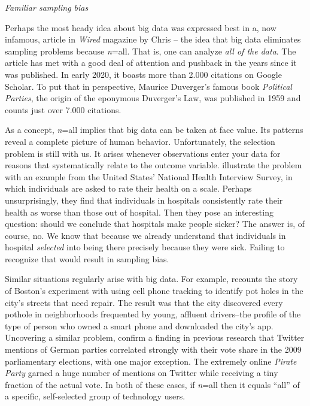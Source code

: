 \documentclass[12pt,]{article}
\begin{document}
\emph{Familiar sampling bias}

Perhaps the most heady idea about big data was expressed best in a, now
infamous, article in \emph{Wired} magazine by Chris \citet{anderson08}
-- the idea that big data eliminates sampling problems because
\emph{n}=all. That is, one can analyze \emph{all of the data}. The
article has met with a good deal of attention and pushback in the years
since it was published. In early 2020, it boasts more than 2.000
citations on Google Scholar. To put that in perspective, Maurice
Duverger's famous book \emph{Political Parties}, the origin of the
eponymous Duverger's Law, was published in 1959 and counts just over
7.000 citations.

As a concept, \emph{n}=all implies that big data can be taken at face
value. Its patterns reveal a complete picture of human behavior.
Unfortunately, the selection problem is still with us. It arises
whenever observations enter your data for reasons that systematically
relate to the outcome variable. \citet{AP08} illustrate the problem with
an example from the United States' National Health Interview Survey, in
which individuals are asked to rate their health on a scale. Perhaps
unsurprisingly, they find that individuals in hospitals consistently
rate their health as worse than those out of hospital. Then they pose an
interesting question: should we conclude that hospitals make people
sicker? The answer is, of course, no. We know that because we already
understand that individuals in hospital \emph{selected} into being there
precisely because they were sick. Failing to recognize that would result
in sampling bias.

Similar situations regularly arise with big data. For example,
\citet{harford14} recounts the story of Boston's experiment with using
cell phone tracking to identify pot holes in the city's streets that
need repair. The result was that the city discovered every pothole in
neighborhoods frequented by young, affluent drivers--the profile of the
type of person who owned a smart phone and downloaded the city's app.
Uncovering a similar problem, \citet{TSSW10} confirm a finding in
previous research that Twitter mentions of German parties correlated
strongly with their vote share in the 2009 parliamentary elections, with
one major exception. The extremely online \emph{Pirate Party} garned a
huge number of mentions on Twitter while receiving a tiny fraction of
the actual vote. In both of these cases, if \emph{n}=all then it equals
``all'' of a specific, self-selected group of technology users.
\end{document}
